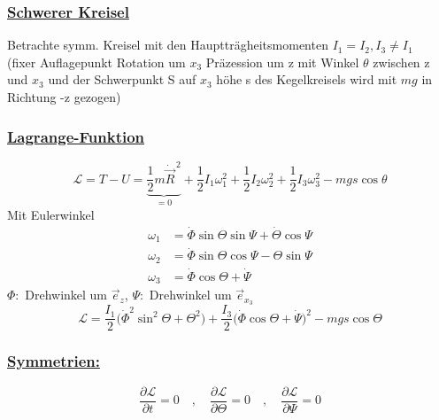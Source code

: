 \documentclass[titlepage,12pt,a4paper,ngerman]{report}
\newcommand{\ub}[1]{\underbrace{#1}}
\newcommand{\lag}{\mathcal{L}}
\begin{document}
\subsubsection{\underline{Schwerer Kreisel}}
Betrachte symm. Kreisel mit den Hauptträgheitsmomenten $ I_1=I_2 , I_3 \neq I_1 $\\
(fixer Auflagepunkt Rotation um $ x_3 $ Präzession um z mit Winkel $ \theta $ zwischen z und $ x_3 $ und der Schwerpunkt S auf $ x_3 $ höhe s des Kegelkreisels wird mit $ mg $ in Richtung -z gezogen)\\
\subsubsection{\underline{Lagrange-Funktion}}
$$\lag = T-U = \ub{\frac{1}{2} m \dot{\vec{R}}^{\, 2}}_{=0} + \frac{1}{2} I_1 \omega_1^2 + \frac{1}{2} I_2 \omega_2^2 + \frac{1}{2} I_3 \omega_3^2 - mg s \cos \theta$$
Mit Eulerwinkel 
\begin{align*}
\omega_1 &= \dot{\Phi} \sin \Theta \sin \Psi + \dot{ \Theta} \cos \Psi\\
\omega_2 &= \dot{\Phi} \sin \Theta \cos \Psi - \Theta \sin \Psi\\
\omega_3 &= \dot{\Phi} \cos \Theta + \dot{\Psi}
\end{align*}
$ \Phi: $ Drehwinkel um $ \vec{e}_z $, $ \Psi: $ Drehwinkel um $ \vec{e}_{x_3} $\\
\begin{equation*}
\lag = \frac{I_1}{2} \bigg( \dot{\Phi}^2 \sin ^2 \Theta + \Theta ^2 \bigg) + \frac{I_3}{2} \bigg( \dot{\Phi} \cos \Theta + \dot{\Psi}\bigg) ^2 - mgs \cos \Theta \tag{1}
\end{equation*}
\subsubsection{\underline{Symmetrien:}}
\begin{equation*}
\frac{\partial \lag}{\partial t} = 0 \quad , \quad \frac{\partial \lag}{\partial \Theta} = 0 \quad , \quad \frac{\partial \lag}{\partial \Psi} = 0
\end{equation*}
\end{document}
